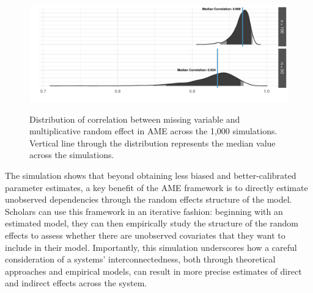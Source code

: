 \begin{figure}
	\centering
	\caption{Distribution of correlation between missing variable and multiplicative random effect in AME across the 1,000 simulations. Vertical line through the distribution represents the median value across the simulations.}
	\label{fig:ameCorr}
	\includegraphics[width=1\textwidth]{graphics/figure5.pdf} \\
\end{figure}

The simulation shows that beyond obtaining less biased and better-calibrated parameter estimates, a key benefit of the AME framework is to directly estimate unobserved dependencies through the random effects structure of the model. Scholars can use this framework in an iterative fashion: beginning with an estimated model, they can then empirically study the structure of the random effects to assess whether there are unobserved covariates that they want to include in their model. Importantly, this simulation underscores how a careful consideration of a systems' interconnectedness, both through theoretical approaches and empirical models, can result in more precise estimates of direct and indirect effects across the system.

